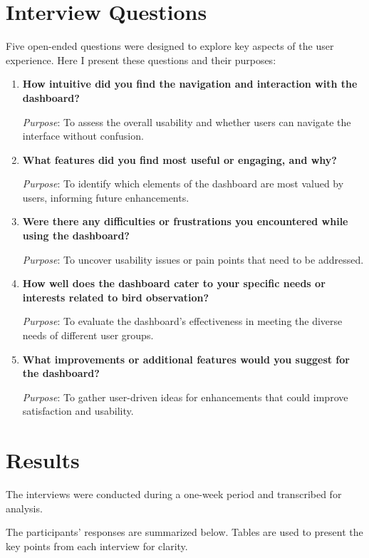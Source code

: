 \section{Interview Questions}

Five open-ended questions were designed to explore key aspects of the user experience. Here I present these questions and their purposes:

\begin{enumerate}
    \item \textbf{How intuitive did you find the navigation and interaction with the dashboard?}

    \textit{Purpose}: To assess the overall usability and whether users can navigate the interface without confusion.

    \item \textbf{What features did you find most useful or engaging, and why?}

    \textit{Purpose}: To identify which elements of the dashboard are most valued by users, informing future enhancements.

    \item \textbf{Were there any difficulties or frustrations you encountered while using the dashboard?}

    \textit{Purpose}: To uncover usability issues or pain points that need to be addressed.

    \item \textbf{How well does the dashboard cater to your specific needs or interests related to bird observation?}

    \textit{Purpose}: To evaluate the dashboard's effectiveness in meeting the diverse needs of different user groups.

    \item \textbf{What improvements or additional features would you suggest for the dashboard?}

    \textit{Purpose}: To gather user-driven ideas for enhancements that could improve satisfaction and usability.
\end{enumerate}

\section{Results}

The interviews were conducted during a one-week period and transcribed for analysis.

The participants' responses are summarized below. Tables are used to present the key points from each interview for clarity. 

